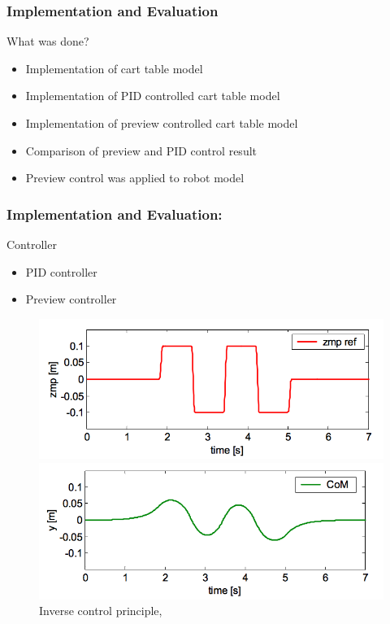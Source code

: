 \documentclass{beamer}
\begin{document}
	\begin{frame}
		\frametitle{Implementation and Evaluation}
		\begin{block}{What was done?}
			\begin{itemize}
				\item
					Implementation of cart table model
				\item
					Implementation of PID controlled cart table model
				\item
					Implementation of preview controlled cart table model
				\item
					Comparison of preview and PID control result
				\item
					Preview control was applied to robot model
			\end{itemize}
		\end{block}
	\end{frame}


\begin{frame}
	\frametitle{Implementation and Evaluation: }
	\begin{block}{Controller}
		\begin{itemize}
			\item
				PID controller
			\item
				Preview controller
		\end{itemize}
	\end{block}
	
	\begin{figure}[h!]
		\begin{minipage}[H]{\linewidth}
			\centering
			\includegraphics[width=0.35\linewidth]{presentation_images/13}
		\end{minipage}
		\begin{minipage}[H]{\linewidth}
			\centering
			\includegraphics[width=0.35\linewidth]{presentation_images/14}
		\end{minipage}
		\caption{Inverse control principle, \cite{kajita2003biped}}
	\end{figure}
\end{frame}
\end{document}

